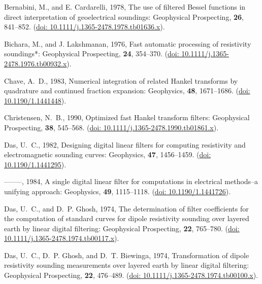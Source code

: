 \documentclass[paper,twocolumn,twoside]{geophysics}
\begin{document}
\begin{thebibliography}{}
Bernabini, M., and E. Cardarelli,  1978, The use of filtered {B}essel functions
  in direct interpretation of geoelectrical soundings: Geophysical Prospecting,
  {\bf 26}, 841--852.
\newblock (\href{https://doi.org/10.1111/j.1365-2478.1978.tb01636.x}{doi:
  10.1111/j.1365-2478.1978.tb01636.x}).

Bichara, M., and J. Lakshmanan,  1976, Fast automatic processing of resistivity
  soundings*: Geophysical Prospecting, {\bf 24}, 354--370.
\newblock (\href{https://doi.org/10.1111/j.1365-2478.1976.tb00932.x}{doi:
  10.1111/j.1365-2478.1976.tb00932.x}).

Chave, A.~D.,  1983, Numerical integration of related {H}ankel transforms by
  quadrature and continued fraction expansion: Geophysics, {\bf 48},
  1671--1686.
\newblock (\href{https://doi.org/10.1190/1.1441448}{doi: 10.1190/1.1441448}).

Christensen, N.~B.,  1990, Optimized fast {H}ankel transform filters:
  Geophysical Prospecting, {\bf 38}, 545--568.
\newblock (\href{https://doi.org/10.1111/j.1365-2478.1990.tb01861.x}{doi:
  10.1111/j.1365-2478.1990.tb01861.x}).

Das, U.~C.,  1982, Designing digital linear filters for computing resistivity
  and electromagnetic sounding curves: Geophysics, {\bf 47}, 1456--1459.
\newblock (\href{https://doi.org/10.1190/1.1441295}{doi: 10.1190/1.1441295}).

--------, 1984, A single digital linear filter for computations in electrical
  methods--a unifying approach: Geophysics, {\bf 49}, 1115--1118.
\newblock (\href{https://doi.org/10.1190/1.1441726}{doi: 10.1190/1.1441726}).

Das, U.~C., and D.~P. Ghosh,  1974, The determination of filter coefficients
  for the computation of standard curves for dipole resistivity sounding over
  layered earth by linear digital filtering: Geophysical Prospecting, {\bf 22},
  765--780.
\newblock (\href{https://doi.org/10.1111/j.1365-2478.1974.tb00117.x}{doi:
  10.1111/j.1365-2478.1974.tb00117.x}).

Das, U.~C., D.~P. Ghosh, and D.~T. Biewinga,  1974, Transformation of dipole
  resistivity sounding measurements over layered earth by linear digital
  filtering: Geophysical Prospecting, {\bf 22}, 476--489.
\newblock (\href{https://doi.org/10.1111/j.1365-2478.1974.tb00100.x}{doi:
  10.1111/j.1365-2478.1974.tb00100.x}).


\end{thebibliography}
\end{document}
